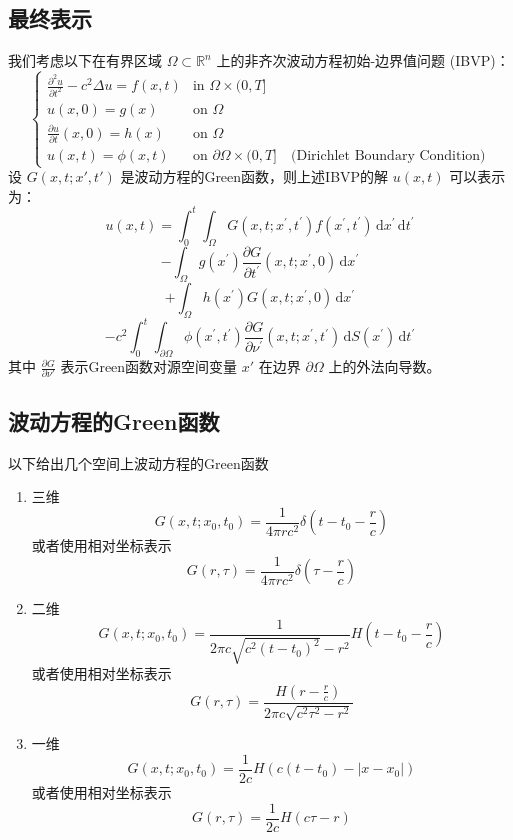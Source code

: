 \documentclass[../../main.tex]{subfiles}
\begin{document}
\subsection{最终表示}

\begin{theorem}
    我们考虑以下在有界区域 $\Omega \subset \mathbb{R}^n$ 上的非齐次波动方程初始-边界值问题 (IBVP)：
    $$ \begin{cases} \frac{\partial^2 u}{\partial t^2} - c^2 \Delta u = f(x,t) & \text{in } \Omega \times (0, T] \\ u(x,0) = g(x) & \text{on } \Omega \\ \frac{\partial u}{\partial t}(x,0) = h(x) & \text{on } \Omega \\ u(x,t) = \phi(x,t) & \text{on } \partial \Omega \times (0, T] \quad \text{(Dirichlet Boundary Condition)} \end{cases} $$
    设 $G(x,t; x',t')$ 是波动方程的Green函数，则上述IBVP的解 $u(x,t)$ 可以表示为：
    $$ u(x,t) = \int_{0}^{t}\int_{ \Omega }G(x,t;x^{\prime} ,t^{\prime}  )f(x^{\prime} ,t^{\prime}  )\,\mathrm{d} x^{\prime} \,\mathrm{d} t^{\prime} $$
    $$ - \int_{ \Omega }g(x^{\prime} )\frac{\partial G}{\partial t^{\prime}}(x,t;x^{\prime} ,0)\,\mathrm{d} x^{\prime} $$
    $$ + \int_{ \Omega }h(x^{\prime} )G(x,t;x^{\prime} ,0)\,\mathrm{d} x^{\prime} $$
    $$ - c^2 \int_{0}^{t}\int_{\partial \Omega }\phi(x^{\prime} ,t^{\prime} )\frac{\partial G}{\partial \nu^{\prime}}(x,t;x^{\prime} ,t^{\prime} )\,\mathrm{d} S(x^{\prime} )\,\mathrm{d} t^{\prime} $$
    其中 $\frac{\partial G}{\partial \nu'}$ 表示Green函数对源空间变量 $x'$ 在边界 $\partial \Omega$ 上的外法向导数。
\end{theorem}


\subsection{波动方程的Green函数}


\begin{theorem}
    以下给出几个空间上波动方程的Green函数
    \begin{enumerate}
        \item 三维 \[
        G\left( x,t;x_0,t_0 \right)= \frac{1 }{4\pi rc^{2} } \delta \left( t-t_0-\frac{r }{c }  \right)   
        \]或者使用相对坐标表示 \[
        G\left( r,\tau  \right)= \frac{1 }{4\pi rc^{2} } \delta \left( \tau -\frac{r }{c }  \right)   
        \]
        \item 二维 \[
        G\left( x,t;x_0,t_0 \right)= \frac{1 }{2\pi c\sqrt{c^{2}\left( t-t_0 \right)^{2} }-r^{2} }H\left( t-t_0-\frac{r }{c }  \right)   
        \]或者使用相对坐标表示 \[
        G\left( r,\tau  \right)= \frac{H\left( r- \frac{r }{c }  \right)  }{2\pi c\sqrt{c^{2}\tau ^{2}-r^{2}} }  
        \]
        \item 一维 \[
        G\left( x,t;x_0,t_0 \right)= \frac{1 }{2c }H\left( c\left( t-t_0 \right)-\left| x-x_0 \right|   \right)   
        \]或者使用相对坐标表示 \[
        G\left( r,\tau  \right)= \frac{1 }{2c }H\left( c\tau -r \right)   
        \]
    \end{enumerate}
    
\end{theorem}
\end{document}
